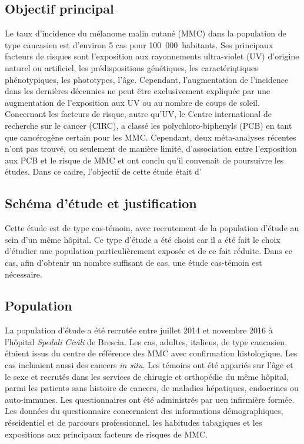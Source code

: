 \documentclass[10pt]{article}
\begin{document}
\subsection{Objectif principal}
Le taux d'incidence du mélanome malin cutané (MMC) dans la population de type caucasien est d'environ 5 cas pour 100~000~habitants. Ses principaux facteurs de risques sont l'exposition aux rayonnements ultra-violet (UV) d'origine naturel ou artificiel, les prédispositions génétiques, les caractériqtiques phénotypiques, les phototypes, l'âge. Cependant, l'augmentation de l'incidence dans les dernières décennies ne peut être exclusivement expliquée par une augmentation de l'exposition aux UV ou au nombre de coups de soleil. Concernant les facteurs de risque, autre qu'UV, le Centre international de recherche sur le cancer (CIRC), a classé les polychloro-biphenyls (PCB) en tant que cancérogène certain pour les MMC.
Cependant, deux méta-analyses récentes n'ont pas trouvé, ou seulement de manière limité, d'association entre l'exposition aux PCB et le risque de MMC et ont conclu qu'il convenait de poursuivre les études. Dans ce cadre, l'objectif de cette étude était d' 

\subsection{Schéma d'étude et justification}
Cette étude est de type cas-témoin, avec recrutement de la population d'étude au sein d'un même hôpital. Ce type d'étude a été choisi car il a été fait le choix d'étudier une population particulièrement exposée et de ce fait réduite. Dans ce cas, afin d'obtenir un nombre suffisant de cas, une étude cas-témoin est nécessaire. 

\subsection{Population}
La population d'étude a été recrutée entre juillet 2014 et novembre 2016 à l'hôpital \emph{Spedali Civili} de Brescia. Les cas, adultes, italiens, de type caucasien, étaient issus du centre de référence des MMC avec confirmation histologique. Les cas incluaient aussi des cancers \emph{in situ}. Les témoins ont été appariés sur l'âge et le sexe et recrutés dans les services de chirugie et orthopédie du même hôpital, parmi les patients sans histoire de cancers, de maladies hépatiques, endocrines ou auto-immunes. Les questionnaires ont été administrés par uen infirmière formée. Les données du questionnaire concernaient des informations démographiques, réseidentiel et de parcours professionnel, les habitudes tabagiques et les expositions aux principaux facteurs de risques de MMC.
\end{document}
